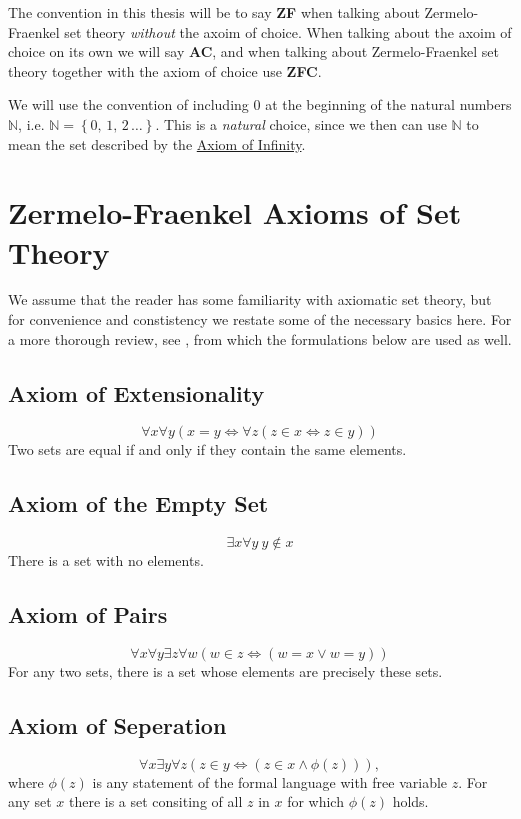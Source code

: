 \documentclass[../../main.tex]{subfiles}
\begin{document}
The convention in this thesis will be to say \textbf{ZF} when talking about Zermelo-Fraenkel set theory \textit{without} the axoim of choice.
When talking about the axoim of choice on its own we will say \textbf{AC}, and when talking about Zermelo-Fraenkel set theory together with the axiom of choice use \textbf{ZFC}.

We will use the convention of including 0 at the beginning of the natural numbers $\mathbb{N}$, i.e. $\mathbb{N} = \left\{0, \, 1, \, 2\, \ldots\right\}$.
This is a \textit{natural} choice, since we then can use $\mathbb{N}$ to mean the set described by the \hyperref[ZF7]{Axiom of Infinity}.

\section{Zermelo-Fraenkel Axioms of Set Theory}
We assume that the reader has some familiarity with axiomatic set theory, but for convenience and constistency we restate some of the necessary basics here. %
For a more thorough review, see \cite{Gol17}, from which the formulations below are used as well.

\subsection{Axiom of Extensionality}
$$\forall x \forall y \left(x = y \iff \forall z \left(z \in x \iff z \in y\right) \right)$$
Two sets are equal if and only if they contain the same elements.

\subsection{Axiom of the Empty Set}
$$\exists x \forall y \ y \notin x$$
There is a set with no elements.

\subsection{Axiom of Pairs}
$$\forall x \forall y \exists z \forall w \left( w \in z \iff \left(w = x \vee w = y \right)\right)$$
For any two sets, there is a set whose elements are precisely these sets.

\subsection{Axiom of Seperation}
$$\forall x \exists y \forall z \left(z \in y \iff \left(z \in x \wedge \phi(z)\right)\right),$$
where $\phi(z)$ is any statement of the formal language with free variable $z$.
For any set $x$ there is a set consiting of all $z$ in $x$ for which $\phi(z)$ holds.
\end{document}
